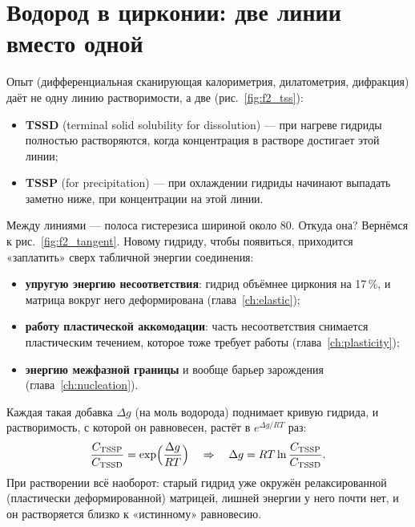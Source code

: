 \section{Водород в цирконии: две линии вместо одной}

Опыт (дифференциальная сканирующая калориметрия, дилатометрия, дифракция) даёт не одну линию растворимости, а
две (рис.~\ref{fig:f2_tss}):
\begin{itemize}
\item \textbf{TSSD} (terminal solid solubility for dissolution) --- при нагреве гидриды полностью растворяются,
  когда концентрация в растворе достигает этой линии;
\item \textbf{TSSP} (for precipitation) --- при охлаждении гидриды начинают выпадать заметно ниже, при концентрации
  на этой линии.
\end{itemize}


Между линиями --- полоса гистерезиса шириной около 80\degC. Откуда она? Вернёмся к рис.~\ref{fig:f2_tangent}.
Новому гидриду, чтобы появиться, приходится «заплатить» сверх табличной энергии соединения:
\begin{itemize}
\item \textbf{упругую энергию несоответствия}: гидрид объёмнее циркония на 17\,\%, и матрица вокруг него
  деформирована (глава~\ref{ch:elastic});
\item \textbf{работу пластической аккомодации}: часть несоответствия снимается пластическим течением, которое тоже
  требует работы (глава~\ref{ch:plasticity});
\item \textbf{энергию межфазной границы} и вообще барьер зарождения (глава~\ref{ch:nucleation}).
\end{itemize}
Каждая такая добавка $\Delta g$ (на моль водорода) поднимает кривую гидрида, и растворимость, с которой он
равновесен, растёт в $e^{\Delta g/RT}$ раз:
\begin{equation}
\frac{C_{\mathrm{TSSP}}}{C_{\mathrm{TSSD}}} = \exp\Bigl(\frac{\Delta g}{RT}\Bigr)
\quad\Rightarrow\quad
\Delta g = RT\ln\frac{C_{\mathrm{TSSP}}}{C_{\mathrm{TSSD}}} .
\end{equation}
При растворении всё наоборот: старый гидрид уже окружён релаксированной (пластически деформированной) матрицей,
лишней энергии у него почти нет, и он растворяется близко к «истинному» равновесию.

